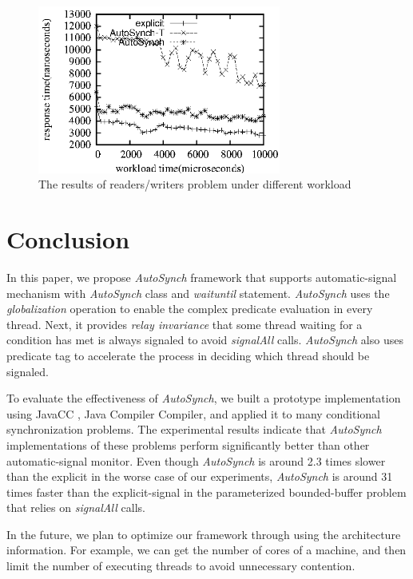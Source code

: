 \documentclass[preprint]{sigplanconf}
\begin{document}
\begin{figure}[ht!]
  \centering
  \includegraphics[width=80mm]{fig/strw.eps}
  \caption{The results of readers/writers problem under different workload}
  \label{fig:srw_eval}
\end{figure}







\section{Conclusion} \label{sec:conclu}
In this paper, we propose {\em AutoSynch} framework that supports 
automatic-signal mechanism with {\em AutoSynch} class and {\em waituntil} statement.
{\em AutoSynch} uses the {\em globalization} operation to enable the complex predicate 
evaluation in every thread. Next, it provides {\em relay invariance} that some
thread waiting for a condition has met is always signaled to avoid {\em signalAll}
calls. {\em AutoSynch} also uses predicate tag to accelerate the process in deciding
which thread should be signaled. 

To evaluate the effectiveness of {\em AutoSynch}, we built a prototype implementation
using JavaCC \cite{kod04}, Java Compiler Compiler,  and applied it to many
conditional synchronization problems. The experimental results indicate that 
{\em AutoSynch} implementations of these problems perform significantly better than
other automatic-signal monitor. Even though {\em AutoSynch} is around 2.3 times 
slower than the explicit in the worse case of our experiments, {\em AutoSynch} is
around 31 times faster than the explicit-signal in the parameterized 
bounded-buffer problem that relies on {\em signalAll} calls. 

In the future, we plan to optimize our framework through using the architecture
information. For example, we can get the number of cores of a machine, and
then limit the number of executing threads to avoid unnecessary contention.
\end{document}
